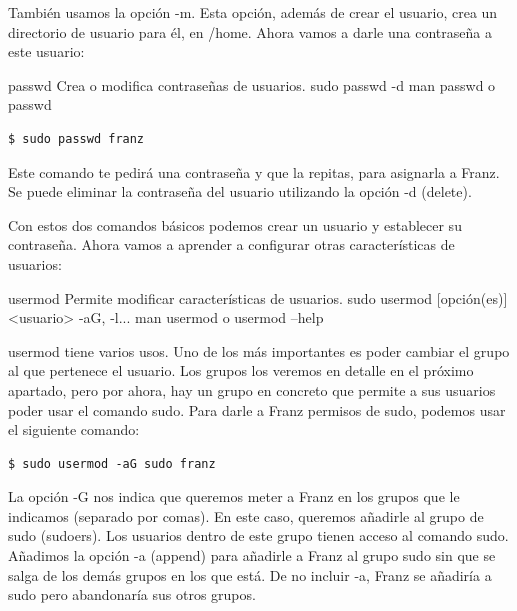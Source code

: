 También usamos la opción -m. Esta opción, además de crear el usuario, crea un directorio de usuario para él, en /home. Ahora vamos a darle una contraseña a este usuario:

\begin{command-info}
{passwd}
{Crea o modifica contraseñas de usuarios.}
{sudo passwd}
{-d}
{man passwd o passwd}
\end{command-info}

\begin{tcolorbox-code}
\begin{lstlisting}
$ sudo passwd franz
\end{lstlisting}
\end{tcolorbox-code}

Este comando te pedirá una contraseña y que la repitas, para asignarla a Franz. Se puede eliminar la contraseña del usuario utilizando la opción -d (delete).

Con estos dos comandos básicos podemos crear un usuario y establecer su contraseña. Ahora vamos a aprender a configurar otras características de usuarios:

\begin{command-info}
{usermod}
{Permite modificar características de usuarios.}
{sudo usermod [opción(es)] <usuario>}
{-aG, -l...}
{man usermod o usermod --help}
\end{command-info}

usermod tiene varios usos. Uno de los más importantes es poder cambiar el grupo al que pertenece el usuario. Los grupos los veremos en detalle en el próximo apartado, pero por ahora, hay un grupo en concreto que permite a sus usuarios poder usar el comando sudo. Para darle a Franz permisos de sudo, podemos usar el siguiente comando:

\begin{tcolorbox-code}
\begin{lstlisting}
$ sudo usermod -aG sudo franz
\end{lstlisting}
\end{tcolorbox-code}

La opción -G nos indica que queremos meter a Franz en los grupos que le indicamos (separado por comas). En este caso, queremos añadirle al grupo de sudo (sudoers). Los usuarios dentro de este grupo tienen acceso al comando sudo. Añadimos la opción -a (append) para añadirle a Franz al grupo sudo sin que se salga de los demás grupos en los que está. De no incluir -a, Franz se añadiría a sudo pero abandonaría sus otros grupos.

